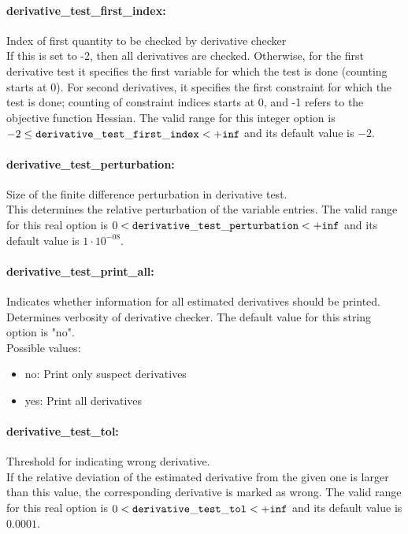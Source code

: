 \paragraph{derivative\_test\_first\_index:}\label{opt:derivative_test_first_index} Index of first quantity to be checked by derivative checker \\
 If this is set to -2, then all derivatives are checked.  Otherwise, for the first derivative test it specifies the first variable for which the test is done (counting starts at 0).  For second derivatives, it specifies the first constraint for which the test is done; counting of constraint indices starts at 0, and -1 refers to the objective function Hessian. The valid range for this integer option is
$-2 \le {\tt derivative\_test\_first\_index } <  {\tt +inf}$
and its default value is $-2$.


\paragraph{derivative\_test\_perturbation:}\label{opt:derivative_test_perturbation} Size of the finite difference perturbation in derivative test. \\
 This determines the relative perturbation of the variable entries. The valid range for this real option is 
$0 <  {\tt derivative\_test\_perturbation } <  {\tt +inf}$
and its default value is $1 \cdot 10^{-08}$.


\paragraph{derivative\_test\_print\_all:}\label{opt:derivative_test_print_all} Indicates whether information for all estimated derivatives should be printed. \\
 Determines verbosity of derivative checker. The default value for this string option is "no".
\\ 
Possible values:
\begin{itemize}
   \item no: Print only suspect derivatives
   \item yes: Print all derivatives
\end{itemize}

\paragraph{derivative\_test\_tol:}\label{opt:derivative_test_tol} Threshold for indicating wrong derivative. \\
 If the relative deviation of the estimated derivative from the given one is larger than this value, the corresponding derivative is marked as wrong. The valid range for this real option is 
$0 <  {\tt derivative\_test\_tol } <  {\tt +inf}$
and its default value is $0.0001$.


